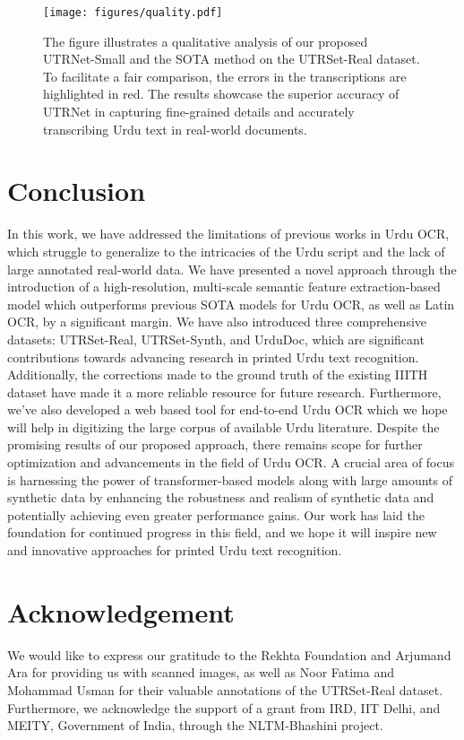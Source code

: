 \documentclass[runningheads]{llncs}
\newcommand{\ModelName}{{UTRNet}\xspace}
\newcommand{\DatasetNameReal}{{UTRSet-Real}\xspace}
\newcommand{\DatasetNameSynth}{{UTRSet-Synth}\xspace}
\newcommand{\DetectionDataset}{{UrduDoc}\xspace}
\begin{document}
\begin{figure}[t]
	\centering
	\texttt{[image: figures/quality.pdf]}
	\caption{The figure illustrates a qualitative analysis of our proposed \ModelName-Small and the SOTA method \cite{iiith17urdu} on the \DatasetNameReal dataset. To facilitate a fair comparison, the errors in the transcriptions are highlighted in red. The results showcase the superior accuracy of \ModelName in capturing fine-grained details and accurately transcribing Urdu text in real-world documents.}
	\label{fig:qualitative_results}
\end{figure} 


\section{Conclusion}
\label{section:conclusion}

In this work, we have addressed the limitations of previous works in Urdu OCR, which struggle to generalize to the intricacies of the Urdu script and the lack of large annotated real-world data. We have presented a novel approach through the introduction of a high-resolution, multi-scale semantic feature extraction-based model which outperforms previous SOTA models for Urdu OCR, as well as Latin OCR, by a significant margin. We have also introduced three comprehensive datasets: \DatasetNameReal, \DatasetNameSynth, and {\DetectionDataset}, which are significant contributions towards advancing research in printed Urdu text recognition. Additionally, the corrections made to the ground truth of the existing IIITH dataset have made it a more reliable resource for future research. Furthermore, we've also developed a web based tool for end-to-end Urdu OCR which we hope will help in digitizing the large corpus of available Urdu literature. Despite the promising results of our proposed approach, there remains scope for further optimization and advancements in the field of Urdu OCR. A crucial area of focus is harnessing the power of transformer-based models along with large amounts of synthetic data by enhancing the robustness and realism of synthetic data and potentially achieving even greater performance gains. Our work has laid the foundation for continued progress in this field, and we hope it will inspire new and innovative approaches for printed Urdu text recognition.
 
\section{Acknowledgement}
\label{section:acknowledgement}

We would like to express our gratitude to the Rekhta Foundation and Arjumand Ara for providing us with scanned images, as well as Noor Fatima and Mohammad Usman for their valuable annotations of the \DatasetNameReal dataset. Furthermore, we acknowledge the support of a grant from IRD, IIT Delhi, and MEITY, Government of India, through the NLTM-Bhashini project. 


\end{document}
